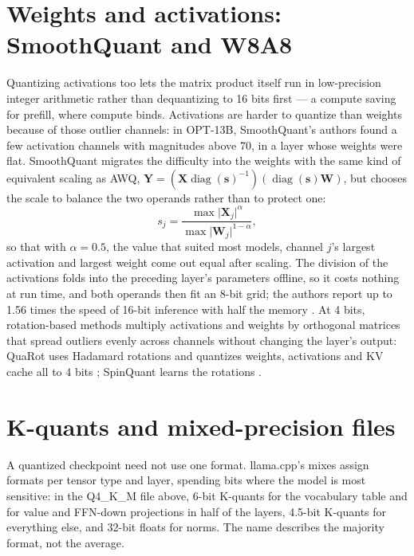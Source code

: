\section{Weights and activations: SmoothQuant and W8A8}

Quantizing activations too lets the matrix product itself run in low-precision
integer arithmetic rather than dequantizing to 16 bits first --- a compute
saving for prefill, where compute binds. Activations are harder to quantize
than weights because of those outlier channels: in OPT-13B, SmoothQuant's authors
found a few activation channels with magnitudes above 70, in a layer whose
weights were flat. SmoothQuant migrates the difficulty into the weights with the
same kind of equivalent scaling as AWQ, $\mathbf{Y} =
(\mathbf{X}\operatorname{diag}(\mathbf{s})^{-1})(\operatorname{diag}(\mathbf{s})\mathbf{W})$,
but chooses the scale to balance the two operands rather than to protect one:
\begin{equation}
s_j = \frac{\max\lvert \mathbf{X}_j\rvert^{\alpha}}{\max\lvert \mathbf{W}_j\rvert^{1-\alpha}},
\label{eq:smoothquant}
\end{equation}
so that with $\alpha = 0.5$, the value that suited most models, channel $j$'s
largest activation and largest weight come out equal after scaling. The division
of the activations folds into the preceding layer's parameters offline, so it
costs nothing at run time, and both operands then fit an 8-bit grid; the
authors report up to 1.56 times the speed of 16-bit inference with half the
memory \cite{xiao2023smoothquant}. At 4 bits,
rotation-based methods multiply activations and weights by orthogonal matrices
that spread outliers evenly across channels without changing the layer's
output: QuaRot uses Hadamard rotations and quantizes weights, activations and
KV cache all to 4 bits \cite{ashkboos2024quarot}; SpinQuant learns the
rotations \cite{liu2025spinquant}.

\section{K-quants and mixed-precision files}

A quantized checkpoint need not use one format. llama.cpp's mixes assign
formats per tensor type and layer, spending bits where the model is most
sensitive: in the Q4\_K\_M file above, 6-bit K-quants for the vocabulary table
and for value and FFN-down projections in half of the layers, 4.5-bit K-quants
for everything else, and 32-bit floats for norms. The name describes the
majority format, not the average.

